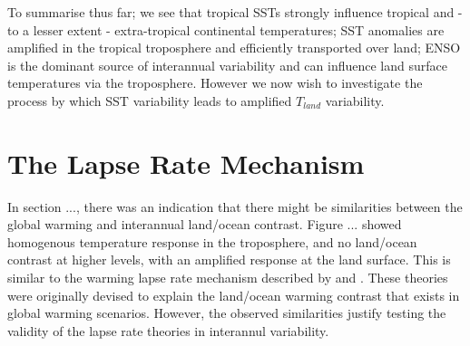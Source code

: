 To summarise thus far; we see that tropical SSTs strongly influence tropical and 
- to a lesser extent - extra-tropical continental temperatures; SST anomalies 
are amplified in the tropical troposphere and efficiently transported over land; 
ENSO is the dominant source of interannual variability and can influence land 
surface temperatures via the troposphere. However we now wish to investigate the 
process by which SST variability leads to amplified $T_{land}$ variability.  



\clearpage

\section{The Lapse Rate Mechanism}

In section ..., there was an indication that there might be similarities between 
the global warming and interannual land/ocean contrast. Figure ...  showed 
homogenous temperature response in the troposphere, and no land/ocean contrast 
at higher levels, with an amplified response at the land surface. This is 
similar to the warming lapse rate mechanism described by \citet{Joshi2007} and 
\citet{Byrne2013a}. These theories were originally devised to explain the 
land/ocean warming contrast that exists in global warming scenarios. However, 
the observed similarities justify testing the validity of the lapse rate 
theories in interannul variability.

